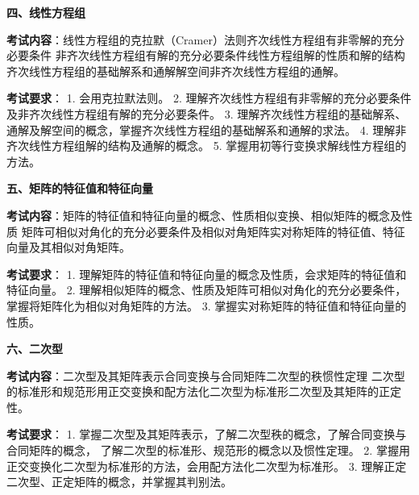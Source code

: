 \begin{fnote}
\textbf{四、线性方程组}

\textbf{考试内容}：线性方程组的克拉默（Cramer）法则\quad 齐次线性方程组有非零解的充分必要条件\quad
非齐次线性方程组有解的充分必要条件\quad 线性方程组解的性质和解的结构\quad
齐次线性方程组的基础解系和通解\quad 解空间\quad 非齐次线性方程组的通解。

\textbf{考试要求}：
1. 会用克拉默法则。
2. 理解齐次线性方程组有非零解的充分必要条件及非齐次线性方程组有解的充分必要条件。
3. 理解齐次线性方程组的基础解系、通解及解空间的概念，掌握齐次线性方程组的基础解系和通解的求法。
4. 理解非齐次线性方程组解的结构及通解的概念。
5. 掌握用初等行变换求解线性方程组的方法。
\end{fnote}

\begin{fnote}
\textbf{五、矩阵的特征值和特征向量}

\textbf{考试内容}：矩阵的特征值和特征向量的概念、性质\quad 相似变换、相似矩阵的概念及性质\quad
矩阵可相似对角化的充分必要条件及相似对角矩阵\quad 实对称矩阵的特征值、特征向量及其相似对角矩阵。

\textbf{考试要求}：
1. 理解矩阵的特征值和特征向量的概念及性质，会求矩阵的特征值和特征向量。
2. 理解相似矩阵的概念、性质及矩阵可相似对角化的充分必要条件，掌握将矩阵化为相似对角矩阵的方法。
3. 掌握实对称矩阵的特征值和特征向量的性质。
\end{fnote}

\begin{fnote}
\textbf{六、二次型}

\textbf{考试内容}：二次型及其矩阵表示\quad 合同变换与合同矩阵\quad 二次型的秩\quad 惯性定理\quad
二次型的标准形和规范形\quad 用正交变换和配方法化二次型为标准形\quad 二次型及其矩阵的正定性。

\textbf{考试要求}：
1. 掌握二次型及其矩阵表示，了解二次型秩的概念，了解合同变换与合同矩阵的概念，
   了解二次型的标准形、规范形的概念以及惯性定理。
2. 掌握用正交变换化二次型为标准形的方法，会用配方法化二次型为标准形。
3. 理解正定二次型、正定矩阵的概念，并掌握其判别法。
\end{fnote}
